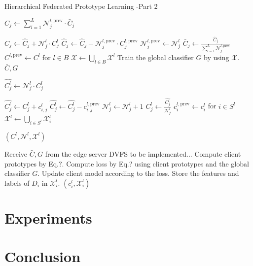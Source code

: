 \documentclass[journal]{IEEEtran}
\begin{document}
\begin{algorithm}[H]
  \caption{Hierarchical Federated Prototype Learning -Part 2}
  \begin{algorithmic}[1]
    \State \( \hat{C}_{j} \gets \sum_{l=1}^{L} {\mathcal{N}_j^{l,\text{prev}}} \cdot\bar{C}_{j} \) 

    \State \( \hat{C}_{j}  \gets \hat{C}_{j} + {\mathcal{N}_j^l} \cdot C^l_j \)
    \State \( \hat{C}_{j}  \gets \hat{C}_{j} - {\mathcal{N}_j^{l,\text{prev}}} \cdot C_j^{l, \text{prev}} \)
    \EndIf
    \State \( {\mathcal{N}_j^{l,\text{prev}}} \gets \mathcal{N}_j^l \)
    \EndFor
    \State \( \bar{C}_{j} \gets \frac{\hat{C}_{j}}{\sum_{l=1}^{L} {\mathcal{N}_j^{l,\text{prev}}}} \)
    \EndFor
    \State \( C^{l,\text{prev}} \gets C^l \) for \( l \in B \)
    \State \( \mathcal{X} \gets \bigcup_{l \in B} \mathcal{X}^l \)
    \State Train the global classifier \( G \) by using \( \mathcal{X} \).
    \State \Return \( \bar{C}, G \)
    \EndProcedure

    \State \( {\hat{C^l_j}} \gets \mathcal{N}^l_j \cdot C^l_{j} \)

    \State \( {\hat{C^l_j}}  \gets {\hat{C^l_j}} + c^l_{i,j} \)
    \State \( {\hat{C^l_j}}  \gets {\hat{C^l_j}} - c^{l,\text{prev}}_{i,j}\)
    \Else
    \State \( \mathcal{N}_j^l \gets \mathcal{N}_j^l + 1 \)
    \EndIf
    \EndFor
    \State \( {C^l_j} \gets \frac{{\hat{C^l_j}}}{\mathcal{N}_j^l} \)
    \EndFor
    \State \( c^{l,\text{prev}}_i \gets c^l_i \) for \( i \in S^l \)
    \State \( \mathcal{X}^l \gets \bigcup_{i \in S^l} \mathcal{X}^l_i \)

    \State \Return \( (C^l, \mathcal{N}^l, \mathcal{X}^l) \)
    \EndProcedure

    \State Receive \( \bar{C}, G \) from the edge server
    \State DVFS to be implemented...
    \State Compute client prototypes by Eq.?.
    \State Compute loss by Eq.? using client prototypes and the global classifier $G$.
    \State Update client model according to the loss.
    \EndFor
    \State Store the features and labels of \(D_i\) in \( \mathcal{X}^l_i \).
    \EndFor
    \State \Return \( (c^l_i, \mathcal{X}^l_i) \)
    \EndProcedure
  \end{algorithmic}
\end{algorithm}

\section{Experiments}

\section{Conclusion}
\end{document}
